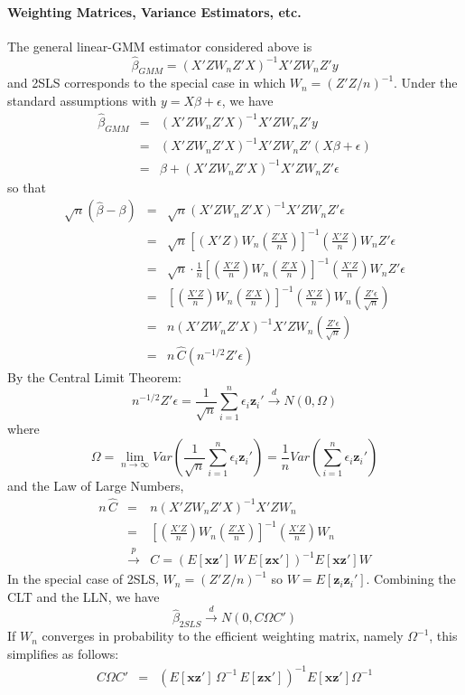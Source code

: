 \documentclass[12pt]{article}
\theoremstyle{definition}
\begin{document}
\paragraph{Weighting Matrices, Variance Estimators, etc.}
The general linear-GMM estimator considered above is 
  $$\widehat{\beta}_{GMM} = (X'Z W_n Z'X)^{-1}X'Z W_n Z'y$$
and 2SLS corresponds to the special case in which $W_n = (Z'Z/n)^{-1}$. Under the standard assumptions with $y = X\beta + \epsilon$, we have
\begin{eqnarray*}
  \widehat{\beta}_{GMM} &=& (X'Z W_n Z'X)^{-1}X'Z W_n Z'y\\
      &=& (X'Z W_n Z'X)^{-1}X'Z W_n Z'(X\beta + \epsilon)\\
      &=&\beta + (X'Z W_n Z'X)^{-1}X'Z W_n Z'\epsilon
\end{eqnarray*}
so that 
\begin{eqnarray*}
  \sqrt{n} \left(\widehat{\beta} - \beta\right) &=& \sqrt{n} (X'Z W_n Z'X)^{-1}X'Z W_n Z'\epsilon\\
    &=& \sqrt{n} \left[\left(X'Z\right) W_n \left(\frac{Z'X}{n} \right) \right]^{-1} \left(\frac{X'Z}{n} \right) W_n Z'\epsilon\\
    &=& \sqrt{n} \cdot \frac{1}{n} \left[\left(\frac{X'Z}{n}\right) W_n \left(\frac{Z'X}{n} \right) \right]^{-1} \left(\frac{X'Z}{n} \right)W_n Z'\epsilon\\
    &=& \left[\left(\frac{X'Z}{n}\right) W_n \left(\frac{Z'X}{n} \right) \right]^{-1} \left(\frac{X'Z}{n} \right)W_n\left(\frac{Z'\epsilon}{\sqrt{n}}\right)\\
    &=& n \left(X'Z W_n Z'X\right)^{-1} X'Z W_n\left(\frac{Z'\epsilon}{\sqrt{n}}\right) \\
    &=& n\,\widehat{C}\left( n^{-1/2} Z'\epsilon\right)
\end{eqnarray*}
By the Central Limit Theorem:
  $$n^{-1/2} Z'\epsilon = \frac{1}{\sqrt{n}} \sum_{i=1}^n \epsilon_i \textbf{z}_i' \overset{d}{\rightarrow} N(0,\Omega)$$
where 
  $$\Omega = \lim_{n\rightarrow \infty} Var \left( \frac{1}{\sqrt{n}} \sum_{i=1}^n \epsilon_i \textbf{z}_i'\right) = \frac{1}{n} Var \left( \sum_{i=1}^n \epsilon_i \textbf{z}_i'\right)$$
and the Law of Large Numbers,
  \begin{eqnarray*}
    n\, \widehat{C} &=& n \left(X'Z W_n Z'X\right)^{-1} X'Z W_n\\ 
        &=& \left[\left(\frac{X'Z}{n}\right) W_n \left(\frac{Z'X}{n} \right) \right]^{-1} \left(\frac{X'Z}{n} \right)W_n\\
        &\overset{p}{\rightarrow}& C = \left( E[\mathbf{x}\mathbf{z}']\,W \,E[\mathbf{z}\mathbf{x}'] \right)^{-1} E[\mathbf{x}\mathbf{z'}] W
  \end{eqnarray*}
In the special case of 2SLS, $W_n = (Z'Z/n)^{-1}$ so $W = E[\mathbf{z}_i\mathbf{z}_i']$. Combining the CLT and the LLN, we have
  $$\widehat{\beta}_{2SLS} \overset{d}{\rightarrow} N(0, C\Omega C')$$
If $W_n$ converges in probability to the efficient weighting matrix, namely $\Omega^{-1}$, this simplifies as follows:
  \begin{eqnarray*}
    C\Omega C' &=&  \left( E[\mathbf{x}\mathbf{z}']\, \Omega^{-1} \,E[\mathbf{z}\mathbf{x}'] \right)^{-1} E[\mathbf{x}\mathbf{z'}] \Omega^{-1}
  \end{eqnarray*}
\end{document}
